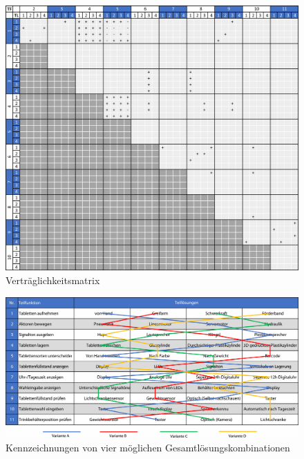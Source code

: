 \begin{figure}[H]
	\centering
	\includegraphics[width=1.0\linewidth]{chapter/Bilder/vertraeglichkeit}
	\caption{Verträglichkeitsmatrix}
	\label{fig:vertraglichkeit}
\end{figure}

\begin{figure}[H]
	\centering
	\includegraphics[width=1.0\linewidth]{chapter/Bilder/loesungskombinationen}
	\caption{Kennzeichnungen von vier möglichen Gesamtlösungskombinationen}
	\label{fig:losungskombinationen}
\end{figure}

